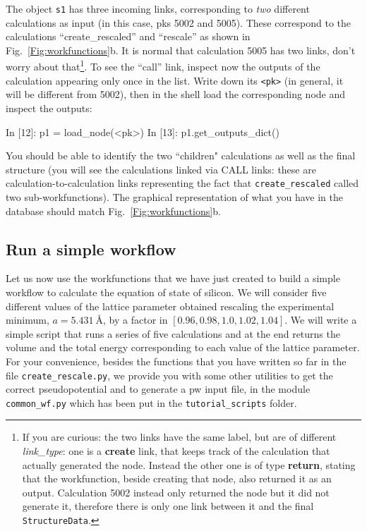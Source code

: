 The object \texttt{s1} has three incoming links, corresponding to \emph{two} different calculations as input (in this case, pks 5002 and 5005). These correspond to the calculations ``create\_rescaled'' and ``rescale'' as shown in Fig.~\ref{Fig:workfunctions}b.
It is normal that calculation 5005 has two links, don't worry about that\footnote{If you are curious: the two links have the same label, but are of different \emph{link\_type}: one is a \textbf{create} link, that keeps track of the calculation that actually generated the node. Instead the other one is of type \textbf{return}, stating that the workfunction, beside creating that node, also returned it as an output. Calculation 5002 instead only returned the node but it did not generate it, therefore there is only one link between it and the final \texttt{StructureData}.}.
To see the ``call'' link, inspect now the outputs of the calculation appearing only once in the list. Write down its \texttt{<pk>} (in general, it will be different from 5002), then in the shell load the corresponding node and inspect the outputs:
\begin{pythoncommand}
In [12]: p1 = load_node(<pk>)
In [13]: p1.get_outputs_dict()
\end{pythoncommand}
\begin{tcolorbox}
You should be able to identify the two ``children" calculations as well as the final structure (you will see the calculations linked via CALL links: these are calculation-to-calculation links representing the fact that \texttt{create\_rescaled} called two sub-workfunctions). The graphical representation of what you have in the database should match Fig.~\ref{Fig:workfunctions}b.  
\end{tcolorbox}

\subsection{\label{sec:sync} Run a simple workflow}

Let us now use the workfunctions that we have just created to build a simple workflow to calculate the equation of state of silicon. We will consider five different values of the lattice parameter obtained rescaling the experimental minimum, $a=5.431~\text{\AA}$, by a factor in $[0.96, 0.98, 1.0, 1.02, 1.04]$. We will write a simple script that runs a series of five calculations and at the end returns the volume and the total energy corresponding to each value of the lattice parameter. For your convenience, besides the functions that you have written so far in the file \texttt{create\_rescale.py}, we provide you with some other utilities to get the correct pseudopotential and to generate a pw input file, in the module \texttt{common\_wf.py} which has been put in the \texttt{tutorial\_scripts} folder.

